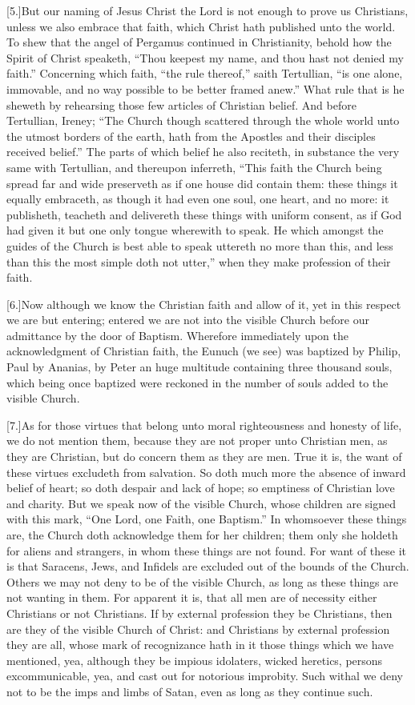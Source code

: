 [5.]But our naming of Jesus Christ the Lord is not enough to prove us Christians, unless we also embrace that faith, which Christ hath published unto the world. To shew that the angel of Pergamus continued in Christianity, behold how the Spirit of Christ speaketh, “Thou keepest my name, and thou hast not denied my faith.” Concerning which faith, “the rule thereof,” saith Tertullian, “is one alone, immovable, and no way possible to be better framed anew.” What rule that is he sheweth by rehearsing those few articles of Christian belief. And before Tertullian, Ireney; “The Church though scattered through the whole world unto the utmost borders of the earth, hath from the Apostles and their disciples received belief.” The  parts of which belief he also reciteth, in substance the very same with Tertullian, and thereupon inferreth, “This faith the Church being spread far and wide preserveth as if one house did contain them: these things it equally embraceth, as though it had even one soul, one heart, and no more: it publisheth, teacheth and delivereth these things with uniform consent, as if God had given it but one only tongue wherewith to speak. He which amongst the guides of the Church is best able to speak uttereth no more than this, and less than this the most simple doth not utter,” when they make profession of their faith.

[6.]Now although we know the Christian faith and allow of it, yet in this respect we are but entering; entered we are not into the visible Church before our admittance by the door of Baptism. Wherefore immediately upon the acknowledgment of Christian faith, the Eunuch (we see) was baptized by Philip, Paul by Ananias, by Peter an huge multitude containing three thousand souls, which being once baptized were reckoned in the number of souls added to the visible Church.

[7.]As for those virtues that belong unto moral righteousness and honesty of life, we do not mention them, because they are not proper unto Christian men, as they are Christian, but do concern them as they are men. True it is, the want of these virtues excludeth from salvation. So doth much  more the absence of inward belief of heart; so doth despair and lack of hope; so emptiness of Christian love and charity. But we speak now of the visible Church, whose children are signed with this mark, “One Lord, one Faith, one Baptism.” In whomsoever these things are, the Church doth acknowledge them for her children; them only she holdeth for aliens and strangers, in whom these things are not found. For want of these it is that Saracens, Jews, and Infidels are excluded out of the bounds of the Church. Others we may not deny to be of the visible Church, as long as these things are not wanting in them. For apparent it is, that all men are of necessity either Christians or not Christians. If by external profession they be Christians, then are they of the visible Church of Christ: and Christians by external profession they are all, whose mark of recognizance hath in it those things which we have mentioned, yea, although they be impious idolaters, wicked heretics, persons excommunicable, yea, and cast out for notorious improbity. Such withal we deny not to be the imps and limbs of Satan, even as long as they continue such.


